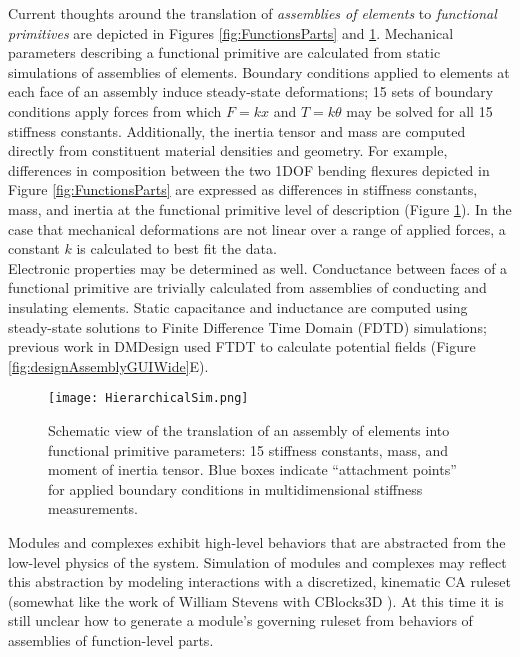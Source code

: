 {Current thoughts around the translation of \textit{assemblies of elements} to \textit{functional primitives} are depicted in Figures \ref{fig:FunctionsParts} and \ref{fig:HierarchicalSim}.  Mechanical parameters describing a functional primitive are calculated from static simulations of assemblies of elements.  Boundary conditions applied to elements at each face of an assembly induce steady-state deformations; 15 sets of boundary conditions apply forces from which $F = kx$ and $T = k\theta$ may be solved for all 15 stiffness constants.  Additionally, the inertia tensor and mass are computed directly from constituent material densities and geometry.  For example, differences in composition between the two 1DOF bending flexures depicted in Figure \ref{fig:FunctionsParts} are expressed as differences in stiffness constants, mass, and inertia at the functional primitive level of description (Figure \ref{fig:HierarchicalSim}).  In the case that mechanical deformations are not linear over a range of applied forces, a constant $k$ is calculated to best fit the data.  \\

Electronic properties may be determined as well.  Conductance between faces of a functional primitive are trivially calculated from assemblies of conducting and insulating elements.  Static capacitance and inductance are computed using steady-state solutions to Finite Difference Time Domain (FDTD) simulations; previous work in DMDesign used FTDT to calculate potential fields (Figure \ref{fig:designAssemblyGUIWide}E).\\

\begin{figure}
  \texttt{[image: HierarchicalSim.png]}
  \caption{Schematic view of the translation of an assembly of elements into functional primitive parameters: 15 stiffness constants, mass, and moment of inertia tensor.  Blue boxes indicate ``attachment points'' for applied boundary conditions in multidimensional stiffness measurements.}
  \label{fig:HierarchicalSim}
\end{figure}

Modules and complexes exhibit high-level behaviors that are abstracted from the low-level physics of the system.  Simulation of modules and complexes may reflect this abstraction by modeling interactions with a discretized, kinematic CA ruleset (somewhat like the work of William Stevens with CBlocks3D \cite{Stevens2009b}).  At this time it is still unclear how to generate a module's governing ruleset from behaviors of assemblies of function-level parts.

}
